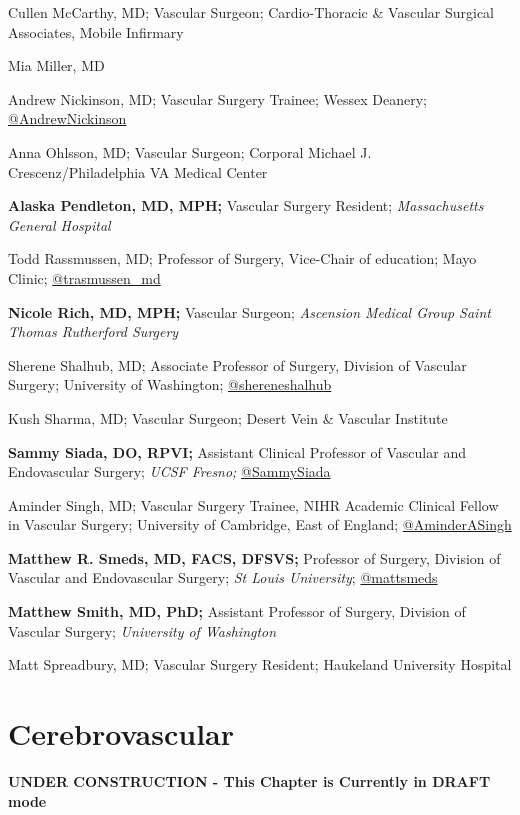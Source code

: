 \documentclass[
]{book}
\begin{document}
Cullen McCarthy, MD; Vascular Surgeon; Cardio-Thoracic \& Vascular Surgical Associates, Mobile Infirmary

Mia Miller, MD

Andrew Nickinson, MD; Vascular Surgery Trainee; Wessex Deanery; \href{https://twitter.com/andrewnickinson}{@AndrewNickinson}

Anna Ohlsson, MD; Vascular Surgeon; Corporal Michael J. Crescenz/Philadelphia VA Medical Center

\textbf{Alaska Pendleton, MD, MPH;} Vascular Surgery Resident; \emph{Massachusetts General Hospital}

Todd Rassmussen, MD; Professor of Surgery, Vice-Chair of education; Mayo Clinic; \href{https://mobile.twitter.com/trasmussen_md}{@trasmussen\_md}

\textbf{Nicole Rich, MD, MPH;} Vascular Surgeon; \emph{Ascension Medical Group Saint Thomas Rutherford Surgery}

Sherene Shalhub, MD; Associate Professor of Surgery, Division of Vascular Surgery; University of Washington; \href{https://twitter.com/shereneshalhub}{@shereneshalhub}

Kush Sharma, MD; Vascular Surgeon; Desert Vein \& Vascular Institute

\textbf{Sammy Siada, DO, RPVI;} Assistant Clinical Professor of Vascular and Endovascular Surgery; \emph{UCSF Fresno;} \href{https://twitter.com/sammysiada}{@SammySiada}

Aminder Singh, MD; Vascular Surgery Trainee, NIHR Academic Clinical Fellow in Vascular Surgery; University of Cambridge, East of England; \href{https://twitter.com/aminderasingh}{@AminderASingh}

\textbf{Matthew R. Smeds, MD, FACS, DFSVS;} Professor of Surgery, Division of Vascular and Endovascular Surgery; \emph{St Louis University}; \href{https://twitter.com/mattsmeds?lang=en}{@mattsmeds}

\textbf{Matthew Smith, MD, PhD;} Assistant Professor of Surgery, Division of Vascular Surgery; \emph{University of Washington}

Matt Spreadbury, MD; Vascular Surgery Resident; Haukeland University Hospital

\hypertarget{cerebrovascular}{%
\chapter{Cerebrovascular}\label{cerebrovascular}}

\textbf{UNDER CONSTRUCTION - This Chapter is Currently in DRAFT mode}
\end{document}
